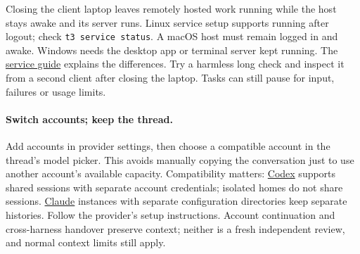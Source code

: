 Closing the client laptop leaves remotely hosted work running while the host stays awake and its server runs. Linux service setup supports running after logout; check \texttt{t3 service status}. A macOS host must remain logged in and awake. Windows needs the desktop app or terminal server kept running. The \href{https://github.com/pingdotgg/t3code/blob/main/docs/user/background-service.md}{service guide} explains the differences. Try a harmless long check and inspect it from a second client after closing the laptop. Tasks can still pause for input, failures or usage limits.

\paragraph{Switch accounts; keep the thread.} Add accounts in provider settings, then choose a compatible account in the thread's model picker. This avoids manually copying the conversation just to use another account's available capacity. Compatibility matters: \href{https://github.com/pingdotgg/t3code/blob/main/docs/user/providers-codex.md}{Codex} supports shared sessions with separate account credentials; isolated homes do not share sessions. \href{https://github.com/pingdotgg/t3code/blob/main/docs/user/providers-claude.md}{Claude} instances with separate configuration directories keep separate histories. Follow the provider's setup instructions. Account continuation and cross-harness handover preserve context; neither is a fresh independent review, and normal context limits still apply.

